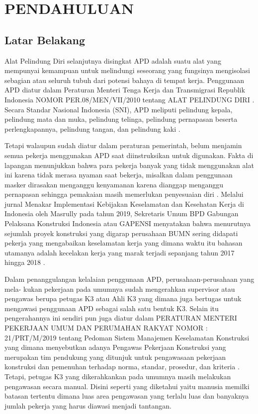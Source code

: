 \chapter{PENDAHULUAN}

\section{Latar Belakang}

Alat Pelindung Diri selanjutnya disingkat APD adalah suatu alat yang mempunyai kemampuan untuk melindungi
seseorang yang fungsinya mengisolasi sebagian atau
seluruh tubuh dari potensi bahaya di tempat kerja.
Penggunaan APD diatur dalam Peraturan Menteri Tenga Kerja
dan Transmigrasi Republik Indonesia NOMOR PER.08/MEN/VII/2010
tentang ALAT PELINDUNG DIRI \cite{suratkementriantenagakerja}.
Secara Standar Nasional Indonesia (SNI), APD meliputi pelindung kepala, pelindung mata dan muka, pelindung telinga,
pelindung pernapasan beserta perlengkapannya, pelindung tangan, dan pelindung kaki \cite{suratkementriantenagakerja}.

Tetapi walaupun sudah diatur dalam peraturan pemerintah, belum menjamin semua pekerja menggunakan APD saat diinstruksikan untuk digunakan. Fakta di lapangan menunjukkan bahwa para pekerja banyak yang tidak menggunakan alat ini karena tidak merasa nyaman saat bekerja, misalkan dalam penggunaan masker dirasakan menganggu kenyamanan karena dianggap menganggu pernapasan sehingga pemakaian masih memerlukan penyesuaian diri \cite{sumamur2014}. Melalui jurnal Menakar Implementasi Kebijakan Keselamatan dan Kesehatan Kerja di Indonesia oleh Masrully pada tahun 2019, Sekretaris Umum BPD Gabungan Pelaksana Konstruksi Indonesia atau GAPENSI menyatakan bahwa menurutnya sejumlah proyek konstruksi yang digarap perusahaan BUMN sering didapati pekerja yang mengabaikan keselamatan kerja yang dimana waktu itu bahasan utamanya adalah kecelakan kerja yang marak terjadi sepanjang tahun 2017 hingga 2018 \cite{masrully2019menakar}.

Dalam penanggulangan kelalaian penggunaan APD, perusahaan-perusahaan yang mela- kukan pekerjaan pada umumnya sudah mengerahkan supervisor atau pengawas berupa petugas K3 atau Ahli K3 yang dimana juga bertugas untuk mengawasi penggunaan APD sebagai salah satu bentuk K3. Selain itu pengerahannya  ini sendiri pun juga diatur dalam PERATURAN MENTERI PEKERJAAN UMUM DAN PERUMAHAN RAKYAT NOMOR : 21/PRT/M/2019 tentang Pedoman Sistem Manajemen Keselamatan Konstruksi yang dimana menyebutkan adanya Pengawas Pekerjaan Konstruksi yang merupakan tim pendukung yang ditunjuk untuk pengawasaan pekerjaan konstruksi dan pemenuhan terhadap norma, standar, prosedur, dan kriteria \cite{permen21prtm2019pedomansistemmanajemenkeselamatankonstruksi}. Tetapi, petugas K3 yang dikerahkankan pada umumnya masih melakukan pengawasan secara manual. Disini seperti yang diketahui yaitu manusia memilki batasan tertentu dimana luas area pengawasan yang terlalu luas dan banyaknya jumlah pekerja yang harus diawasi menjadi tantangan.

